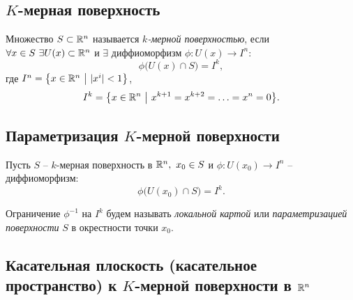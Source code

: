 \subsection{$ K $-мерная поверхность}

\begin{definition}
    Множество $ S \subset \mathbb{R}^n $ называется \emph{$ k $-мерной поверхностью}, если $ \forall x \in S \ \exists U(x)\subset\R^n $ и $ \exists $ диффиоморфизм $ \phi: U(x)\rightarrow I^n $:
    \[
        \phi\big(U(x)\cap S\big) = I^k,
    \] где $ I^n = \big\{x \in \mathbb{R}^n \ \big| \ |x^i| < 1 \big\} $,
    \[
        I^k = \big\{x \in \mathbb{R}^n \ \big| \ x^{k+1} = x^{k+2} = \ldots = x^n = 0\big\}.
    \]
\end{definition}

\subsection{Параметризация $ K $-мерной поверхности}

\begin{definition}
    Пусть $S$ -- $k$-мерная поверхность в $\mathbb{R}^n, \ x_0 \in S$ и $\phi: U(x_0) \rightarrow I^n$ -- диффиоморфизм:
    \[
        \phi\big(U(x_0)\cap S\big) = I^k.
    \]

    Ограничение $\phi^{-1}$ на $I^k$ будем называть \emph{локальной картой} или \emph{параметризацией поверхности} $S$ в окрестности точки $x_0$.
\end{definition}

\subsection{Касательная плоскость (касательное пространство) к $ K $-мерной поверхности в $ \mathbb{R}^n $}

